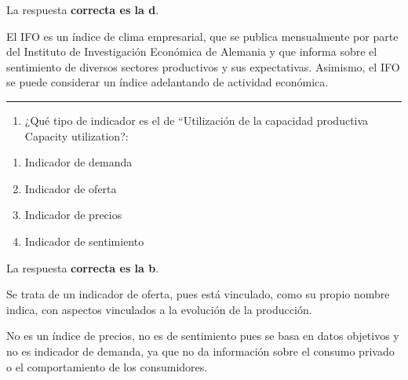 \documentclass[
  letterpaper,
  DIV=11,
  numbers=noendperiod]{scrreprt}
\providecommand{\tightlist}{%
  \setlength{\itemsep}{0pt}\setlength{\parskip}{0pt}}\usepackage{longtable,booktabs,array}
\begin{document}
\begin{tcolorbox}[enhanced jigsaw, left=2mm, opacityback=0, colback=white, breakable, arc=.35mm, bottomrule=.15mm, rightrule=.15mm, toprule=.15mm, leftrule=.75mm, colframe=quarto-callout-tip-color-frame]
\begin{minipage}[t]{5.5mm}
\textcolor{quarto-callout-tip-color}{\faLightbulb}
\end{minipage}%
\begin{minipage}[t]{\textwidth - 5.5mm}

La respuesta \textbf{correcta es la d}.

El IFO es un índice de clima empresarial, que se publica mensualmente
por parte del Instituto de Investigación Económica de Alemania y que
informa sobre el sentimiento de diversos sectores productivos y sus
expectativas. Asimismo, el IFO se puede considerar un índice adelantando
de actividad económica.

\end{minipage}%
\end{tcolorbox}

\begin{center}\rule{0.5\linewidth}{0.5pt}\end{center}

\begin{enumerate}
\def\labelenumi{\arabic{enumi}.}
\setcounter{enumi}{13}
\tightlist
\item
  ¿Qué tipo de indicador es el de ``Utilización de la capacidad
  productiva Capacity utilization?:
\end{enumerate}

\begin{enumerate}
\def\labelenumi{\alph{enumi})}
\item
  Indicador de demanda
\item
  Indicador de oferta
\item
  Indicador de precios
\item
  Indicador de sentimiento
\end{enumerate}

\begin{tcolorbox}[enhanced jigsaw, left=2mm, opacityback=0, colback=white, breakable, arc=.35mm, bottomrule=.15mm, rightrule=.15mm, toprule=.15mm, leftrule=.75mm, colframe=quarto-callout-tip-color-frame]
\begin{minipage}[t]{5.5mm}
\textcolor{quarto-callout-tip-color}{\faLightbulb}
\end{minipage}%
\begin{minipage}[t]{\textwidth - 5.5mm}

La respuesta \textbf{correcta es la b}.

Se trata de un indicador de oferta, pues está vinculado, como su propio
nombre indica, con aspectos vinculados a la evolución de la producción.

No es un índice de precios, no es de sentimiento pues se basa en datos
objetivos y no es indicador de demanda, ya que no da información sobre
el consumo privado o el comportamiento de los consumidores.

\end{minipage}%
\end{tcolorbox}
\end{document}
